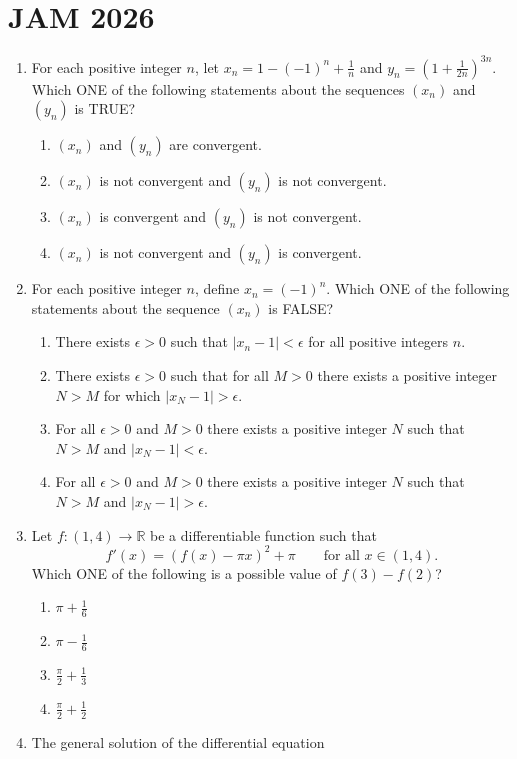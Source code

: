 \section{JAM 2026}
\begin{enumerate}
\item For each positive integer $n$, let $x_n=1-(-1)^n+\frac1n$ and $y_n=\left(1+\frac1{2n}\right)^{3n}$. Which ONE of the following statements about the sequences $(x_n)$ and $(y_n)$ is TRUE?
\begin{enumerate}[label=(\Alph*)]
\item $(x_n)$ and $(y_n)$ are convergent.
\item $(x_n)$ is not convergent and $(y_n)$ is not convergent.
\item $(x_n)$ is convergent and $(y_n)$ is not convergent.
\item $(x_n)$ is not convergent and $(y_n)$ is convergent.
\end{enumerate}
\item For each positive integer $n$, define $x_n=(-1)^n$. Which ONE of the following statements about the sequence $(x_n)$ is FALSE?
\begin{enumerate}[label=(\Alph*)]
\item There exists $\epsilon>0$ such that $|x_n-1|<\epsilon$ for all positive integers $n$.
\item There exists $\epsilon>0$ such that for all $M>0$ there exists a positive integer $N>M$ for which $|x_N-1|>\epsilon$.
\item For all $\epsilon>0$ and $M>0$ there exists a positive integer $N$ such that $N>M$ and $|x_N-1|<\epsilon$.
\item For all $\epsilon>0$ and $M>0$ there exists a positive integer $N$ such that $N>M$ and $|x_N-1|>\epsilon$.
\end{enumerate}
\item Let $f:(1,4)\to\mathbb R$ be a differentiable function such that
\[f'(x)=(f(x)-\pi x)^2+\pi \qquad\text{for all }x\in(1,4).\]
Which ONE of the following is a possible value of $f(3)-f(2)$?
\begin{enumerate}[label=(\Alph*)]
\item $\pi+\frac16$
\item $\pi-\frac16$
\item $\frac{\pi}{2}+\frac13$
\item $\frac{\pi}{2}+\frac12$
\end{enumerate}
\item The general solution of the differential equation

\end{enumerate}
